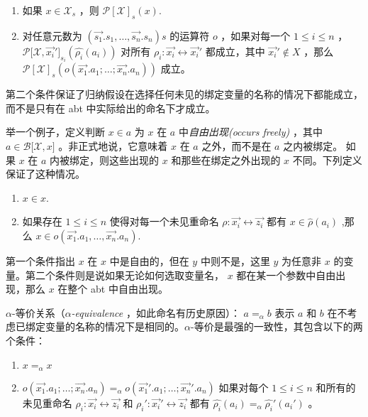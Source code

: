 \begin{enumerate}
\def\labelenumi{\arabic{enumi}.}
\item
  如果 \(x \in \mathcal{X}_s\) ，则 \(\mathcal{P[X]}_s(x)\).
\item
  对任意元数为 \((\vec{s_1}.s_1,\dots,\vec{s_n}.s_n)s\) 的运算符 \(o\)
  ，如果对每一个 \(1\leq i \leq n\) ，
  \(\mathcal{P[X},\vec{x_i}']_{s_i}(\hat{\rho_i}(a_i))\) 对所有
  \(\rho_i:\vec{x_i}\leftrightarrow \vec{x_i}'\) 都成立，其中
  \(\vec{x_i}' \notin X\) ，那么
  \(\mathcal{P[X]}_s(o(\vec{x_1}.a_1;\dots;\vec{x_n}.a_n))\) 成立。
\end{enumerate}

第二个条件保证了归纳假设在选择任何未见的绑定变量的名称的情况下都能成立，而不是只有在
abt 中实际给出的命名下才成立。

举一个例子，定义判断 \(x\in a\) 为 \(x\) 在 \(a\)
中\emph{自由出现(occurs freely)} ，其中 \(a\in \mathcal{B[X},x]\)
。非正式地说，它意味着 \(x\) 在 \(a\) 之外，而不是在 \(a\) 之内被绑定。
如果 \(x\) 在 \(a\) 内被绑定，则这些出现的 \(x\) 和那些在绑定之外出现的
\(x\) 不同。下列定义保证了这种情况。

\begin{enumerate}
\def\labelenumi{\arabic{enumi}.}
\item
  \(x\in x\).
\item
  如果存在 \(1\leq i \leq n\) 使得对每一个未见重命名
  \(\rho:\vec{x_i}\leftrightarrow \vec{z_i}\) 都有
  \(x\in \hat{\rho}(a_i)\) ,那么
  \(x \in o(\vec{x_1}.a_1,\dots,\vec{x_n}.a_n)\).
\end{enumerate}

第一个条件指出 \(x\) 在 \(x\) 中是自由的，但在 \(y\) 中则不是，这里
\(y\) 为任意非 \(x\) 的变量。第二个条件则是说如果无论如何选取变量名，
\(x\) 都在某一个参数中自由出现，那么 \(x\) 在整个 abt 中自由出现。

$\alpha$-等价关系（\emph{$\alpha$-equivalence} ，如此命名有历史原因）：
\(a=_\alpha b\) 表示 \(a\) 和 \(b\)
在不考虑已绑定变量的名称的情况下是相同的。$\alpha$-等价是最强的一致性，其包含以下的两个条件：

\begin{enumerate}
\def\labelenumi{\arabic{enumi}.}
\item
  \(x=_\alpha x\)
\item
  \(o(\vec{x_1}.a_1;\dots;\vec{x_n}.a_n) =_\alpha o(\vec{x_1}'.a_1;\dots;\vec{x_n}'.a_n)\)
  如果对每个 \( 1\leq i\leq n\) 和所有的未见重命名
  \(\rho_i:\vec{x_i}\leftrightarrow\vec{z_i}\) 和
  \(\rho_i':\vec{x_i}'\leftrightarrow\vec{z_i}\) 都有
  \(\hat{\rho_i}(a_i)=_\alpha\hat{\rho_i}'(a_i')\) 。
\end{enumerate}

